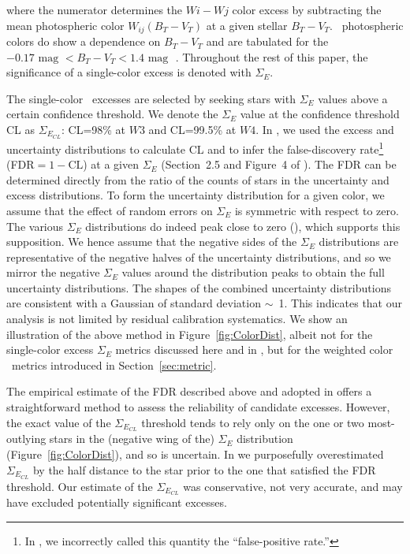     \noindent where the numerator determines the $Wi-Wj$ color excess by subtracting the mean photospheric color $W_{ij}(B_T-V_T)$ at a given stellar $B_T-V_T$.  \WS\ photospheric colors do show a dependence on $B_T-V_T$ and are tabulated for the  $-0.17\mbox{ mag }<B_T-V_T<1.4\mbox{ mag }$ \citep[see published erratum;][]{Patel2014b}. Throughout the rest of this paper, the significance of a single-color excess is denoted with $\Sigma_E$.
        
    The single-color \WS\ excesses are selected by seeking stars with $\Sigma_E$ values above a certain confidence threshold. We denote the $\Sigma_E$ value at the confidence threshold CL as $\Sigma_{E_{CL}}$: CL=98\% at $W3$ and CL=99.5\% at $W4$.  In , we used the excess and uncertainty distributions to calculate CL and to infer the false-discovery rate\footnote{In , we incorrectly called this quantity the ``false-positive rate.''} (FDR$=1-\mbox{CL}$) at a given $\Sigma_E$ (Section~2.5 and Figure~4 of ). The FDR can be determined directly from the ratio of the counts of stars in the uncertainty and excess distributions. To form the uncertainty distribution for a given color, we assume that the effect of random errors on $\Sigma_E$ is symmetric with respect to zero. The various $\Sigma_E$ distributions do indeed peak close to zero (), which supports this supposition. We hence assume that the negative sides of the $\Sigma_E$ distributions are representative of the negative halves of the uncertainty distributions, and so we mirror the negative $\Sigma_E$ values around the distribution peaks to obtain the full uncertainty distributions. The shapes of the combined uncertainty distributions are consistent with a Gaussian of standard deviation $\sim$~1. This indicates that our analysis is not limited by residual calibration systematics. We show an illustration of the above method in Figure~\ref{fig:ColorDist}, albeit not for the single-color excess $\Sigma_E$ metrics discussed here and in , but for the weighted color \ES\ metrics introduced in Section~\ref{sec:metric}.
        
    The empirical estimate of the FDR described above and adopted in  offers a straightforward method to assess the reliability of candidate excesses. However, the exact value of the $\Sigma_{E_{CL}}$ threshold tends to rely only on the one or two most-outlying stars in the (negative wing of the) $\Sigma_E$ distribution (Figure~\ref{fig:ColorDist}), and so is uncertain. In  we purposefully overestimated $\Sigma_{E_{CL}}$ by the half distance to the star prior to the one that satisfied the FDR threshold. Our estimate of the $\Sigma_{E_{CL}}$ was conservative, not very accurate, and may have excluded potentially significant excesses. 
    
